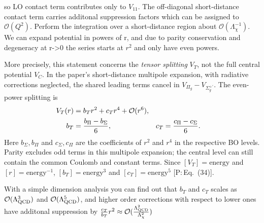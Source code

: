 \documentclass[11pt,a4paper]{article}
\newcommand{\tagP}[1]{\textcolor{blue!65!black}{\textsf{\small[P:\,#1]}}}
\newenvironment{aiadd}{\par}{\par}
\begin{document}
so LO contact term contributes only to $V_{11}$. The off-diagonal short-distance contact term carries additonal suppression factors which can be assigned to $\mathcal{O}(Q^2)$. Perform the integration over a short-distance region about $\mathcal{O}(\Lambda_\chi^{-1})$.
We can expand potential in powers of r, and due to parity conservation and degeneracy at r->0 the series starts at $r^2$ and only have even powers.
\begin{aiadd}
	More precisely, this statement concerns the \emph{tensor splitting}
	$V_T$, not the full central potential $V_C$. In the paper's
	short-distance multipole expansion, with radiative corrections
	neglected, the shared leading terms cancel in
	$V_{\Pi_g}-V_{\Sigma_g^{+\prime}}$. The even-power splitting is
	\begin{align}
		V_T(r)&=b_Tr^2+c_Tr^4+\mathcal O(r^6),\notag\\
		b_T&=\frac{b_\Pi-b_\Sigma}{6},
		&
		c_T&=\frac{c_\Pi-c_\Sigma}{6}.
		\label{eq:pc-tensor-expansion}
	\end{align}
	Here $b_\Sigma,b_\Pi$ and $c_\Sigma,c_\Pi$ are the coefficients of
	$r^2$ and $r^4$ in the respective BO levels.
	Parity excludes odd terms in this multipole expansion; the central
	level can still contain the common Coulomb and constant terms.
	Since $[V_T]=\text{energy}$ and $[r]=\text{energy}^{-1}$,
	$[b_T]=\text{energy}^3$ and $[c_T]=\text{energy}^5$
	\tagP{Eq.~(34)}.
\end{aiadd}

With a simple dimension analysis you can find out that $b_T$ and $c_T$ scales as $\mathcal{O}(\Lambda_{\rm QCD}^3)$ and $\mathcal{O}(\Lambda_{\rm QCD}^5)$, and higher order corrections with respect to lower ones have additonal suppression by $\frac{c_T}{b_T}r^2 \approx \mathcal{O}(\frac{\Lambda_{\rm QCD}^2}{\Lambda_\chi^2})$
\end{document}
